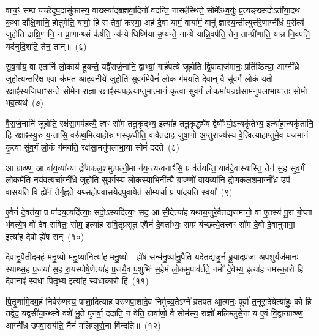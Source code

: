वाच॒ꣳ॒ सम्प्र य॑च्छेदुप॒दासु॑कास्य॒ वाख्स्या᳚द्ब्रह्मवा॒दिनो॑ वदन्ति॒ नासꣴ॑स्थिते॒ सोमे᳚\-ऽध्व॒र्युः प्र॒त्यङ्ख्सदो\-ऽती॑या॒दथ॑ क॒था दा᳚क्षि॒णानि॒ होतु॑मेति॒ यामो॒ हि स तेषां॒ कस्मा॒ अह॑ दे॒वा यामं॒ वाया॑मं॒ वानु॑ ज्ञास्य॒न्तीत्युत्त॑रे॒णाग्नी᳚ध्रं प॒रीत्य॑ जुहोति दाक्षि॒णानि॒ न प्रा॒णान्थ्सं क॑र्\mbox{}षति॒ न्य॑न्ये धिष्णि॑या उ॒प्यन्ते॒ नान्ये यान्नि॒वप॑ति॒ तेन॒ तान्प्री॑णाति॒ यान्न नि॒वप॑ति॒ यद॑नुदि॒शति॒ तेन॒ तान्॥~(६)

{\anuvakamend[{स्तु॒ते वि॒न्दते॒ हि वी॑यन्ते प्र॒तीची॑रुद्गा॒त्र उ॒प्यन्ते॒ चतु॑र्दश च}]}%

सु॒व॒र्गाय॒ वा ए॒तानि॑ लो॒काय॑ हूयन्ते॒ यद्वै॑सर्ज॒नानि॒ द्वाभ्यां॒ गार्\mbox{}ह॑पत्ये जुहोति द्वि॒पाद्यज॑मानः॒ प्रति॑ष्ठित्या॒ आग्नी᳚ध्रे जुहोत्य॒न्तरि॑क्ष ए॒वा क्र॑मत आहव॒नीये॑ जुहोति सुव॒र्गमे॒वैनं॑ लो॒कं ग॑मयति दे॒वान् वै सु॑व॒र्गं लो॒कं य॒तो रक्षाꣴ॑स्यजिघाꣳस॒न्ते सोमे॑न॒ राज्ञा॒ रक्षाꣴ॑स्यप॒हत्या॒प्तुमा॒त्मानं॑ कृ॒त्वा सु॑व॒र्गं लो॒कमा॑य॒न्रक्ष॑सा॒मनु॑पलाभा॒यात्तः॒ सोमो॑ भव॒त्यथ॑~(७)

वै॒स॒र्ज॒नानि॑ जुहोति॒ रक्ष॑सा॒मप॑हत्यै॒ त्वꣳ सो॑म तनू॒कृद्भ्य॒ इत्या॑ह तनू॒कृद्ध्ये॑ष द्वेषो᳚भ्यो॒\-ऽन्यकृ॑तेभ्य॒ इत्या॑हा॒न्यकृ॑तानि॒ हि रक्षाꣴ॑स्यु॒रु य॒न्तासि॒ वरू॑थ॒मित्या॑हो॒रु ण॑स्कृ॒धीति॒ वावैतदा॑ह जुषा॒णो अ॒प्तुराज्य॑स्य वे॒त्वित्या॑हा॒प्तुमे॒व यज॑मानं कृ॒त्वा सु॑व॒र्गं लो॒कं ग॑मयति॒ रक्ष॑सा॒मनु॑पलाभा॒या सोमं॑ ददते~(८)

आ ग्राव्ण्ण॒ आ वा॑य॒व्या᳚न्या द्रो॑णकल॒शमुत्पत्नी॒मा न॑य॒न्त्यन्वनाꣳ॑सि॒ प्र व॑र्तयन्ति॒ याव॑दे॒वास्यास्ति॒ तेन॑ स॒ह सु॑व॒र्गं लो॒कमे॑ति॒ नय॑वत्य॒र्चाग्नी᳚ध्रे जुहोति सुव॒र्गस्य॑ लो॒कस्या॒भिनी᳚त्यै॒ ग्राव्ण्णो॑ वाय॒व्या॑नि द्रोणकल॒शमाग्नी᳚ध्र॒ उप॑ वासयति॒ वि ह्ये॑नं॒ तैर्गृ॒ह्णते॒ यथ्स॒होप॑वा॒सये॑दपुवा॒येत॑ सौ॒म्यर्चा प्र पा॑दयति॒ स्वया᳚~(९)

ए॒वैनं॑ दे॒वत॑या॒ प्र पा॑दय॒त्यदि॑त्याः॒ सदो॒\-ऽस्यदि॑त्याः॒ सद॒ आ सी॒देत्या॑ह यथाय॒जुरे॒वैतद्यज॑मानो॒ वा ए॒तस्य॑ पु॒रा गो॒प्ता भ॑वत्ये॒ष वो॑ देव सवितः॒ सोम॒ इत्या॑ह सवि॒तृप्र॑सूत ए॒वैनं॑ दे॒वता᳚भ्यः॒ सम्प्र य॑च्छत्ये॒तत्त्वꣳ सो॑म दे॒वो दे॒वानुपा॑गा॒ इत्या॑ह दे॒वो ह्ये॑ष सन्~(१०)

दे॒वानु॒पैती॒दम॒हं म॑नु॒ष्यो॑ मनु॒ष्या॑नित्या॑ह मनु॒ष्यो  ह्ये॑ष सन्म॑नु॒ष्या॑नु॒पैति॒ यदे॒तद्यजु॒र्न ब्रू॒यादप्र॑जा अप॒शुर्यज॑मानः स्याथ्स॒ह प्र॒जया॑ स॒ह रा॒यस्पोषे॒णेत्या॑ह प्र॒जयै॒व प॒शुभिः॑ स॒हेमं लो॒कमु॒पाव॑र्तते॒ नमो॑ दे॒वेभ्य॒ इत्या॑ह नमस्का॒रो हि दे॒वानाꣴ॑ स्व॒धा पि॒तृभ्य॒ इत्या॑ह स्वधाका॒रो हि~(११)

पि॒तृ॒णामि॒दम॒हं निर्वरु॑णस्य॒ पाशा॒दित्या॑ह वरुणपा॒शादे॒व निर्मु॑च्य॒ते\-ऽग्ने᳚ व्रतपत आ॒त्मनः॒ पूर्वा॑ त॒नूरा॒देयेत्या॑हुः॒ को हि तद्वेद॒ यद्वसी॑या॒न्थ्स्वे वशे॑ भू॒ते पुन॑र्वा॒ ददा॑ति॒ न वेति॒ ग्रावा॑णो॒ वै सोम॑स्य॒ राज्ञो॑ मलिम्लुसे॒ना य ए॒वं वि॒द्वान्ग्राव्ण्ण॒ आग्नी᳚ध्र उपवा॒सय॑ति॒ नैनं॑ मलिम्लुसे॒ना वि॑न्दति॥~(१२)

